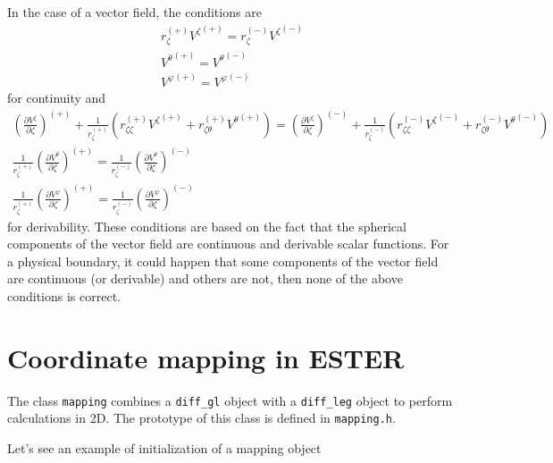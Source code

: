 In the case of a vector field, the conditions are
\begin{equation}
\begin{array}{c}
\displaystyle r_\zeta^{(+)} {V^\zeta}^{(+)}=r_\zeta^{(-)} {V^\zeta}^{(-)} \\
\displaystyle {V^\theta}^{(+)}={V^\theta}^{(-)} \\
\displaystyle {V^\varphi}^{(+)}={V^\varphi}^{(-)} 
\end{array}
\end{equation}
for continuity and
\begin{equation}
\begin{array}{c}
\displaystyle \left(\frac{\partial V^{\zeta}}{\partial\zeta}\right)^{(+)}
+\frac{1}{r_\zeta^{(+)}}\left(r_{\zeta\zeta}^{(+)}{V^\zeta}^{(+)}+r_{\zeta\theta}^{(+)}{V^\theta}^{(+)}\right)=
\left(\frac{\partial V^{\zeta}}{\partial\zeta}\right)^{(-)}
+\frac{1}{r_\zeta^{(-)}}\left(r_{\zeta\zeta}^{(-)}{V^\zeta}^{(-)}+r_{\zeta\theta}^{(-)}{V^\theta}^{(-)}\right) \\
\displaystyle \frac{1}{r_\zeta^{(+)}}\left(\frac{\partial V^{\theta}}{\partial\zeta}\right)^{(+)}= 
\frac{1}{r_\zeta^{(-)}}\left(\frac{\partial V^{\theta}}{\partial\zeta}\right)^{(-)} \\
\displaystyle \frac{1}{r_\zeta^{(+)}}\left(\frac{\partial V^{\varphi}}{\partial\zeta}\right)^{(+)}= 
\frac{1}{r_\zeta^{(-)}}\left(\frac{\partial V^{\varphi}}{\partial\zeta}\right)^{(-)}
\end{array}
\end{equation}
for derivability. These conditions are based on the fact that the spherical components of the vector field
are continuous and derivable scalar functions. For a physical boundary, it could happen that 
some components of the vector
field are continuous (or derivable) and others are not, then none of the above conditions is correct.

\pagebreak

\section{Coordinate mapping in ESTER}

The class \verb|mapping| combines a \verb|diff_gl| object with a \verb|diff_leg| object to perform 
calculations in 2D. The prototype of this class is defined in \verb|mapping.h|.

Let's see an example of initialization of a mapping object

